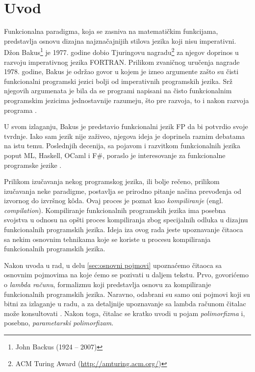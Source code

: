 \section{Uvod}
\label{sec:uvod}


Funkcionalna paradigma, koja se zasniva na matematičkim funkcijama, predstavlja osnovu dizajna najznačajnijih stilova jezika koji nisu imperativni. Džon Bakus\footnote{John Backus (1924 -- 2007)} je 1977. godine dobio Tjuringovu nagradu\footnote{ACM Turing Award (\url{http://amturing.acm.org/})} za njegov doprinos u razvoju imperativnog jezika FORTRAN. Prilikom zvaničnog uručenja nagrade 1978. godine, Bakus je održao govor u kojem je izneo argumente zašto su čisti funkcionalni programski jezici bolji od imperativnih programskih jezika. Srž njegovih argumenata je bila da se programi napisani na čisto funkcionalnim programskim jezicima jednostavnije razumeju, što pre razvoja, to i nakon razvoja programa \cite{Can-Programming-Be-Liberated-from-the-von-Neumann-Style?, Concepts-of-Programming-Languages}.


U svom izlaganju, Bakus je predstavio funkcionalni jezik FP da bi potvrdio svoje tvrdnje. Iako sam jezik nije zaživeo, njegova ideja je doprinela raznim debatama na istu temu. Poslednjih decenija, sa pojavom i razvitkom funkcionalnih jezika poput ML, Haskell, OCaml i F\#, poraslo je interesovanje za funkcionalne programske jezike \cite{Concepts-of-Programming-Languages}.

Prilikom izučavanja nekog programskog jezika, ili bolje rečeno, prilikom izučavanja neke paradigme, postavlja se prirodno pitanje načina prevođenja od izvornog do izvršnog k\^oda. Ovaj proces je poznat kao \textit{kompiliranje} (engl. \textit{compilation}). Kompiliranje funkcionalnih programskih jezika ima posebna svojstva u odnosu na opšti proces kompiliranja zbog specijalnih odluka u dizajnu funkcionalnih programskih jezika. Ideja iza ovog rada jeste upoznavanje čitaoca sa nekim osnovnim tehnikama koje se koriste u procesu kompiliranja funkcionalnih programskih jezika.

Nakon uvoda u rad, u delu \ref{sec:osnovni pojmovi} upoznaćemo čitaoca sa osnovnim pojmovima na koje ćemo se pozivati u daljem tekstu. Prvo, govorićemo o \textit{lambda računu}, formalizmu koji predstavlja osnovu za kompiliranje funkcionalnih programskih jezika. Naravno, odabrani su samo oni pojmovi koji su bitni za izlaganje u radu, a za detaljnije upoznavanje sa lambda računom čitalac može konsultovati \cite{Introduction-to-Combinators-and-Lambda-Calculus}. Nakon toga, čitalac se kratko uvodi u pojam \textit{polimorfizma} i, posebno, \textit{parametarski polimorfizam}.

